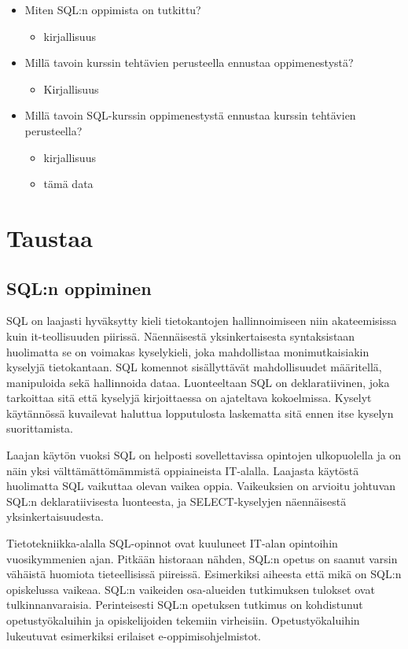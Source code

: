 \documentclass[finnish,twoside,openright]{HYgraduMLDS}
\begin{document}
\begin{itemize}
    \item Miten SQL:n oppimista on tutkittu?
    \begin{itemize}
        \item kirjallisuus
    \end{itemize}
    \item Millä tavoin kurssin tehtävien perusteella ennustaa oppimenestystä?
    \begin{itemize}
        \item Kirjallisuus
    \end{itemize}
    \item Millä tavoin SQL-kurssin oppimenestystä ennustaa kurssin tehtävien perusteella?
    \begin{itemize}
        \item kirjallisuus
        \item tämä data
    \end{itemize}
\end{itemize}


\chapter{Taustaa}

\section{SQL:n oppiminen}

SQL on laajasti hyväksytty kieli tietokantojen hallinnoimiseen niin akateemisissa kuin it-teollisuuden piirissä. Näennäisestä yksinkertaisesta syntaksistaan huolimatta se on voimakas kyselykieli, joka mahdollistaa monimutkaisiakin kyselyjä tietokantaan. SQL komennot sisällyttävät mahdollisuudet määritellä, manipuloida sekä hallinnoida dataa. Luonteeltaan SQL on deklaratiivinen, joka tarkoittaa sitä että kyselyjä kirjoittaessa on ajateltava kokoelmissa. Kyselyt käytännössä kuvailevat haluttua lopputulosta laskematta sitä ennen itse kyselyn suorittamista.

Laajan käytön vuoksi SQL on helposti sovellettavissa opintojen ulkopuolella ja on näin yksi välttämättömämmistä oppiaineista IT-alalla. Laajasta käytöstä huolimatta SQL vaikuttaa olevan vaikea oppia. Vaikeuksien on arvioitu johtuvan SQL:n deklaratiivisesta luonteesta, ja SELECT-kyselyjen näennäisestä yksinkertaisuudesta\cite{sadiq2004sqlator}.

Tietotekniikka-alalla SQL-opinnot ovat kuuluneet IT-alan opintoihin vuosikymmenien ajan. Pitkään historaan nähden, SQL:n opetus on saanut varsin vähäistä huomiota tieteellisissä piireissä\cite{Taipalus:2019:EFS:3287324.3287359}. Esimerkiksi aiheesta että mikä on SQL:n opiskelussa vaikeaa. SQL:n vaikeiden osa-alueiden tutkimuksen tulokset ovat tulkinnanvaraisia\cite{Taipalus:2019:EFS:3287324.3287359}. Perinteisesti SQL:n opetuksen tutkimus on kohdistunut opetustyökaluihin ja opiskelijoiden tekemiin virheisiin\cite{Taipalus:2019:EFS:3287324.3287359}. Opetustyökaluihin lukeutuvat esimerkiksi erilaiset e-oppimisohjelmistot.
\end{document}
